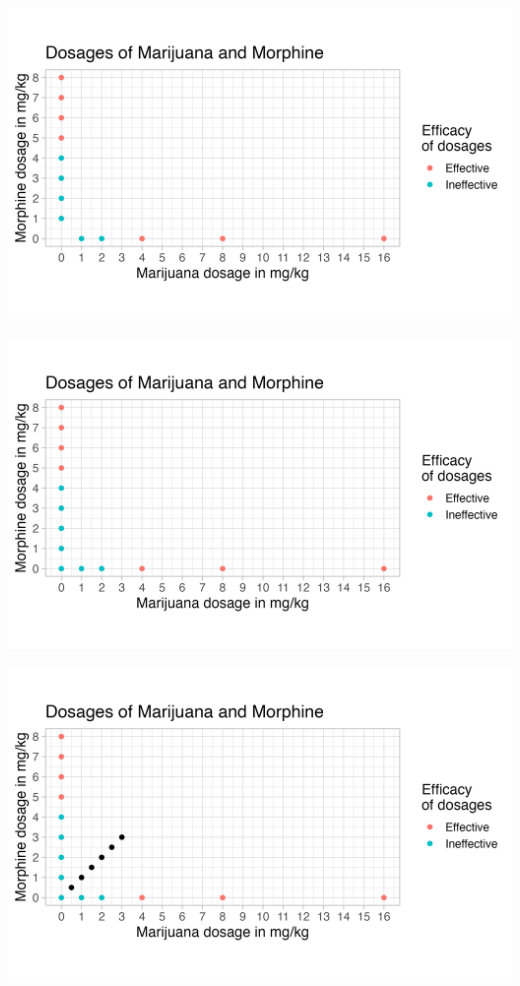 \documentclass[14pt]{beamer}
\begin{document}
\begin{frame}
\begin{center}
\includegraphics[scale=0.6]{iso4.png}
\end{center}
\end{frame}

\begin{frame}
\begin{center}
\includegraphics[scale=0.6]{iso5.png}
\end{center}
\end{frame}

\begin{frame}
\begin{center}
\includegraphics[scale=0.6]{iso6.png}
\end{center}
\end{frame}
\end{document}
